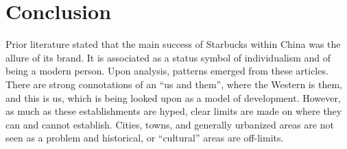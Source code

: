 \section{Conclusion}

Prior literature stated that the main success of Starbucks within China was the
allure of its brand. It is associated as a status symbol of individualism and of
being a modern person. Upon analysis, patterns emerged from these articles.
There are strong connotations of an ``us and them'', where the Western is them,
and this is us, which is being looked upon as a model of development. However,
as much as these establishments are hyped, clear limits are made on where they
can and cannot establish. Cities, towns, and generally urbanized areas are not
seen as a problem and historical, or ``cultural'' areas are off-limits.


%


